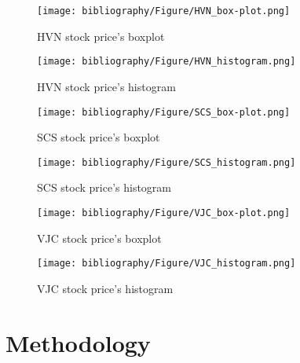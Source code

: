 \documentclass{ieeeojies}
\begin{document}
\begin{figure}[H]
    \centering
    \begin{minipage}{0.23\textwidth}
    \centering
    \texttt{[image: bibliography/Figure/HVN\_box-plot.png]}
    \caption{HVN stock price's boxplot}
    \label{fig:1}
    \end{minipage}
    \hfill
    \begin{minipage}{0.23\textwidth}
    \centering
    \texttt{[image: bibliography/Figure/HVN\_histogram.png]}
    \caption{HVN stock price's histogram}
    \label{fig:2}
    \end{minipage}
\end{figure}

\begin{figure}[H]
    \centering
    \begin{minipage}{0.23\textwidth}
    \centering
    \texttt{[image: bibliography/Figure/SCS\_box-plot.png]}
    \caption{SCS stock price's boxplot}
    \label{fig:1}
    \end{minipage}
    \hfill
    \begin{minipage}{0.23\textwidth}
    \centering
    \texttt{[image: bibliography/Figure/SCS\_histogram.png]}
    \caption{SCS stock price's histogram}
    \label{fig:2}
    \end{minipage}
\end{figure}

\begin{figure}[H]
    \centering
    \begin{minipage}{0.23\textwidth}
    \centering
    \texttt{[image: bibliography/Figure/VJC\_box-plot.png]}
    \caption{VJC stock price's boxplot}
    \label{fig:1}
    \end{minipage}
    \hfill
    \begin{minipage}{0.23\textwidth}
    \centering
    \texttt{[image: bibliography/Figure/VJC\_histogram.png]}
    \caption{VJC stock price's histogram}
    \label{fig:2}
    \end{minipage}
\end{figure}

\section{Methodology}
\end{document}
